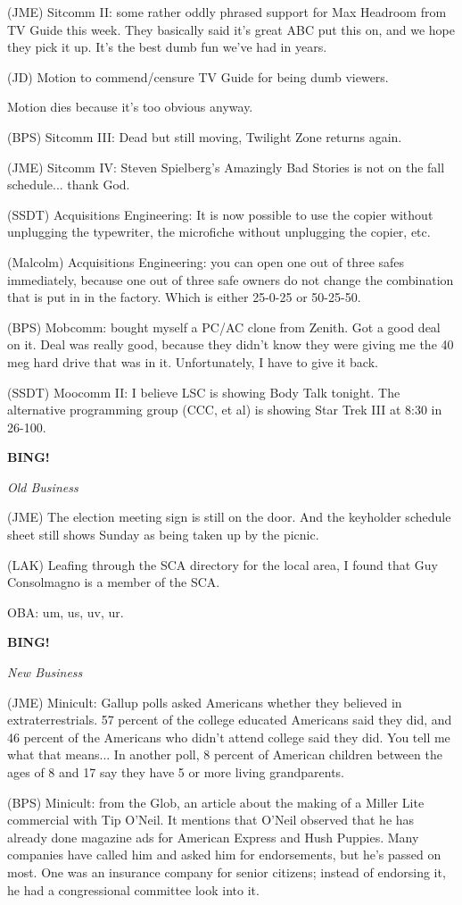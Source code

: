 \documentclass[12pt]{article}
\newcommand{\bing}{{\bf BING!} }
\newcommand{\goto}[1]{\bing \vskip 12pt \centerline{{\em{#1}}}}
\begin{document}
(JME) Sitcomm II: some rather oddly phrased support for Max Headroom from TV Guide this week. They basically said it's great ABC put this on, and we hope they pick it up. It's the best dumb fun we've had in years.

(JD) Motion to commend/censure TV Guide for being dumb viewers.

Motion dies because it's too obvious anyway.

(BPS) Sitcomm III: Dead but still moving, Twilight Zone returns again.

(JME) Sitcomm IV: Steven Spielberg's Amazingly Bad Stories is not on the fall schedule... thank God.

(SSDT) Acquisitions Engineering: It is now possible to use the copier without unplugging the typewriter, the microfiche without unplugging the copier, etc.

(Malcolm) Acquisitions Engineering: you can open one out of three safes immediately, because one out of three safe owners do not change the combination that is put in in the factory. Which is either 25-0-25 or 50-25-50.

(BPS) Mobcomm: bought myself a PC/AC clone from Zenith. Got a good deal on it. Deal was really good, because they didn't know they were giving me the 40 meg hard drive that was in it. Unfortunately, I have to give it back.

(SSDT) Moocomm II: I believe LSC is showing Body Talk tonight. The alternative programming group (CCC, et al) is showing Star Trek III at 8:30 in 26-100.

\goto{Old Business}

(JME) The election meeting sign is still on the door. And the keyholder schedule sheet still shows Sunday as being taken up by the picnic.

(LAK) Leafing through the SCA directory for the local area, I found that Guy Consolmagno is a member of the SCA.

OBA: um, us, uv, ur.

\goto{New Business}

(JME) Minicult: Gallup polls asked Americans whether they believed in extraterrestrials. 57 percent of the college educated Americans said they did, and 46 percent of the Americans who didn't attend college said they did. You tell me what that means... In another poll, 8 percent of American children between the ages of 8 and 17 say they have 5 or more living grandparents.

(BPS) Minicult: from the Glob, an article about the making of a Miller Lite commercial with Tip O'Neil. It mentions that O'Neil observed that he has already done magazine ads for American Express and Hush Puppies. Many companies have called him and asked him for endorsements, but he's passed on most. One was an insurance company for senior citizens; instead of endorsing it, he had a congressional committee look into it.
\end{document}
